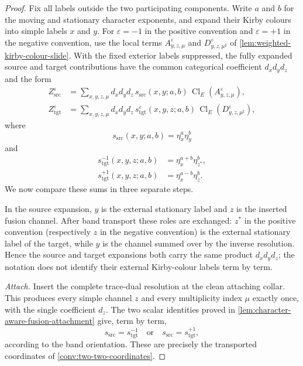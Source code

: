 \begin{proof}
Fix all labels outside the two participating components.  Write $a$ and $b$
for the moving and stationary character exponents, and expand their Kirby
colours into simple labels $x$ and $y$.  For
$\varepsilon=-1$ in the positive convention and $\varepsilon=+1$ in the
negative convention, use the local terms
$A^\varepsilon_{y,z,\mu}$ and $D^\varepsilon_{y,z,\mu^\sharp}$ of
\cref{lem:weighted-kirby-colour-slide}.  With the fixed exterior labels
suppressed, the fully expanded source and target contributions have the
common categorical coefficient $d_xd_yd_z$ and the form
\[
\begin{aligned}
  Z_{\mathrm{src}}^\varepsilon
    &=\sum_{x,y,z,\mu}d_xd_yd_z\,
      s_{\mathrm{src}}(x,y;a,b)\,
      \operatorname{Cl}_E(A^\varepsilon_{y,z,\mu}),\\
  Z_{\mathrm{tgt}}^\varepsilon
    &=\sum_{x,y,z,\mu}d_xd_yd_z\,
      s_{\mathrm{tgt}}^\varepsilon(x,y,z;a,b)\,
      \operatorname{Cl}_E(D^\varepsilon_{y,z,\mu^\sharp}),
\end{aligned}
\]
where
\[
  s_{\mathrm{src}}(x,y;a,b)=\eta_x^a\eta_y^b
\]
and
\[
\begin{aligned}
  s_{\mathrm{tgt}}^{-1}(x,y,z;a,b)
    &=\eta_x^{a+b}\eta_{z^*}^{b},\\
  s_{\mathrm{tgt}}^{+1}(x,y,z;a,b)
    &=\eta_x^{a-b}\eta_z^{b}.
\end{aligned}
\]
We now compare these sums in three separate steps.

In the source expansion, $y$ is the external stationary label and $z$ is the
inserted fusion channel.  After band transport these roles are exchanged:
$z^*$ in the positive convention (respectively $z$ in the negative
convention) is the external stationary label of the target, while $y$ is the
channel summed over by the inverse resolution.  Hence the source and target
expansions both carry the same product $d_xd_yd_z$; the notation does not
identify their external Kirby-colour labels term by term.

\emph{Attach.}
Insert the complete trace-dual resolution at the clean attaching collar.
This produces every simple channel $z$ and every multiplicity index $\mu$
exactly once, with the single coefficient $d_z$.  The two scalar identities
proved in \cref{lem:character-aware-fusion-attachment} give, term by term,
\[
  s_{\mathrm{src}}=s_{\mathrm{tgt}}^{-1}
  \quad\text{or}\quad
  s_{\mathrm{src}}=s_{\mathrm{tgt}}^{+1},
\]
according to the band orientation.  These are precisely the transported
coordinates of \cref{conv:two-two-coordinates}.


\end{proof}
